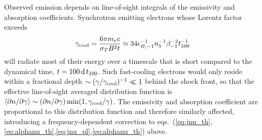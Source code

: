\documentclass[twocolumn]{aastex63}
\begin{document}
Observed emission depends on line-of-sight integrals of the emissivity and absorption coefficients. 
Synchrotron emitting electrons whose Lorentz factor exceeds
\begin{equation}
\label{eq:gamma_cool}
    \gamma_{\rm cool} = \frac{6\pi m_e c}{\sigma_T B^2 t}
    \approx 34 \epsilon_{B,-1}^{-1} n_5^{-1} \beta_{-1}^{-2} t_{100}^{-1}
\end{equation}
will radiate most of their energy over a timescale that is short compared to the dynamical time, $t = 100\,{\rm d}\,t_{100}$. Such fast-cooling electrons would only reside within a fractional depth $\sim (\gamma / \gamma_{\rm cool})^{-1} \ll 1$ behind the shock front, so that the effective line-of-sight averaged distribution function is 
$\langle \partial n / \partial \gamma \rangle  \sim (\partial n / \partial \gamma) \min( 1, \gamma_{\rm cool}/\gamma )$.
The emissivity and absorption coefficient are proportional to this distribution function and therefore similarly affected, introducing a frequency-dependent correction to eqs.~(\ref{eq:jnu_th},\ref{eq:alphanu_th},\ref{eq:jnu_pl},\ref{eq:alphanu_th}) above.
\end{document}
